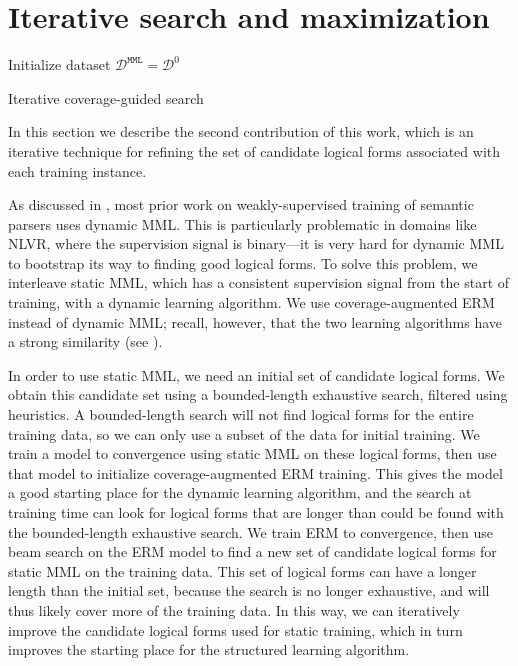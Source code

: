 \section{Iterative search and maximization} \label{sec:iterative_search}
\begin{algorithm}[h!]
	\SetAlgoLined
	Initialize dataset $\mathcal{D}^{\texttt{MML}} = \mathcal{D}^0$\;
	\caption{Iterative coverage-guided search}\label{alg:iterative_search}
\end{algorithm}

In this section we describe the second contribution of this work, which is an
iterative technique for refining the set of candidate logical forms associated
with each training instance.

As discussed in , most prior work on
weakly-supervised training of semantic parsers uses dynamic MML\@.  This is
particularly problematic in domains like NLVR, where the supervision signal is
binary---it is very hard for dynamic MML to bootstrap its way to finding good
logical forms.  To solve this problem, we interleave static MML, which has a
consistent supervision signal from the start of training, with a dynamic
learning algorithm.  We use coverage-augmented ERM instead of dynamic MML;
recall, however, that the two learning algorithms have a strong similarity (see
).

In order to use static MML, we need an initial set of candidate logical forms.
We obtain this candidate set using a bounded-length exhaustive search, filtered
using heuristics.  A bounded-length search will not find logical forms for the
entire training data, so we can only use a subset of the data for initial
training.  We train a model to convergence using static MML on these logical
forms, then use that model to initialize coverage-augmented ERM training.  This
gives the model a good starting place for the dynamic learning algorithm, and
the search at training time can look for logical forms that are longer than
could be found with the bounded-length exhaustive search.  We train ERM to
convergence, then use beam search on the ERM model to find a new set of
candidate logical forms for static MML on the training data.  This set of
logical forms can have a longer length than the initial set, because the search
is no longer exhaustive, and will thus likely cover more of the training data.
In this way, we can iteratively improve the candidate logical forms used for
static training, which in turn improves the starting place for the structured
learning algorithm.

